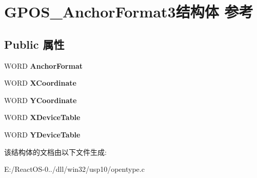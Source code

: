 \hypertarget{struct_g_p_o_s___anchor_format3}{}\section{G\+P\+O\+S\+\_\+\+Anchor\+Format3结构体 参考}
\label{struct_g_p_o_s___anchor_format3}
\subsection*{Public 属性}
\begin{DoxyCompactItemize}
\item 
\mbox{\label{struct_g_p_o_s___anchor_format3_ae4ba79fa221b8616aa2291ec5683e1f3}} 
W\+O\+RD {\bfseries Anchor\+Format}
\item 
\mbox{\label{struct_g_p_o_s___anchor_format3_a2c6d325d301cb95f136a4ae5705f6574}} 
W\+O\+RD {\bfseries X\+Coordinate}
\item 
\mbox{\label{struct_g_p_o_s___anchor_format3_a2e27f677ba9d88f08a74919621d5fbff}} 
W\+O\+RD {\bfseries Y\+Coordinate}
\item 
\mbox{\label{struct_g_p_o_s___anchor_format3_a765cbadc7616aa1f14833a76a523de8f}} 
W\+O\+RD {\bfseries X\+Device\+Table}
\item 
\mbox{\label{struct_g_p_o_s___anchor_format3_a02001f1890dd6dc6a1a5613cd867af15}} 
W\+O\+RD {\bfseries Y\+Device\+Table}
\end{DoxyCompactItemize}


该结构体的文档由以下文件生成\+:\begin{DoxyCompactItemize}
\item 
E\+:/\+React\+O\+S-\/0../dll/win32/usp10/opentype.\+c\end{DoxyCompactItemize}
